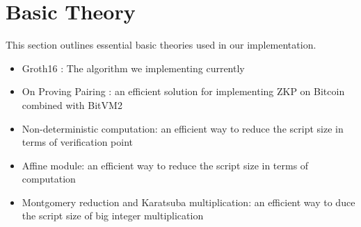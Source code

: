 \section{Basic Theory} \label{sec:basic theory}
This section outlines essential basic theories used in our implementation.

\begin{itemize}
    \item Groth16 \cite{website:Groth16}: The algorithm we implementing currently
    \item On Proving Pairing \cite{website:On-proving-pairing}: an efficient solution for implementing ZKP on Bitcoin combined with BitVM2 \cite{website:BitVM2}
    \item Non-deterministic computation: an efficient way to reduce the script size in terms of verification point
    \item Affine module: an efficient way to reduce the script size in terms of computation
    \item Montgomery reduction and Karatsuba multiplication: an efficient way to duce the script size of big integer multiplication
\end{itemize}






